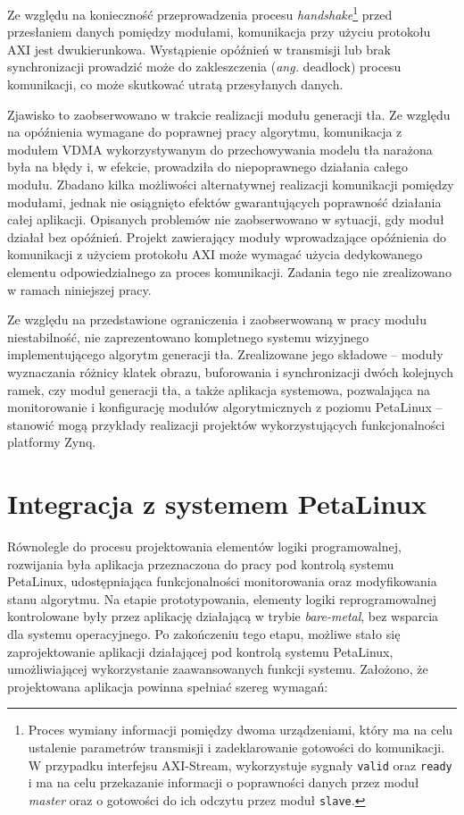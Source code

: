 Ze względu na konieczność przeprowadzenia procesu \textit{handshake}\footnote{Proces wymiany informacji pomiędzy dwoma urządzeniami, który ma na celu ustalenie parametrów transmisji i zadeklarowanie gotowości do komunikacji. W przypadku interfejsu AXI-Stream, wykorzystuje sygnały \texttt{valid} oraz \texttt{ready} i ma na celu przekazanie informacji o poprawności danych przez moduł \textit{master} oraz o gotowości do ich odczytu przez moduł \texttt{slave}.} przed przesłaniem danych pomiędzy modułami, komunikacja przy użyciu protokołu AXI jest dwukierunkowa. Wystąpienie opóźnień w transmisji lub brak synchronizacji prowadzić może do zakleszczenia (\emph{ang.} deadlock) procesu komunikacji, co może skutkować utratą przesyłanych danych.

Zjawisko to zaobserwowano w trakcie realizacji modułu generacji tła. Ze względu na opóźnienia wymagane do poprawnej pracy algorytmu, komunikacja z modułem VDMA wykorzystywanym do przechowywania modelu tła narażona była na błędy i, w efekcie, prowadziła do niepoprawnego działania całego modułu. Zbadano kilka możliwości alternatywnej realizacji komunikacji pomiędzy modułami, jednak nie osiągnięto efektów gwarantujących poprawność działania całej aplikacji. Opisanych problemów nie zaobserwowano w sytuacji, gdy moduł działał bez opóźnień.
Projekt zawierający moduły wprowadzające opóźnienia do komunikacji z użyciem protokołu AXI może wymagać użycia dedykowanego elementu odpowiedzialnego za proces komunikacji. Zadania tego nie zrealizowano w ramach niniejszej pracy.

Ze względu na przedstawione ograniczenia i zaobserwowaną w pracy modułu niestabilność, nie zaprezentowano kompletnego systemu wizyjnego implementującego algorytm generacji tła. Zrealizowane jego składowe -- moduły wyznaczania różnicy klatek obrazu, buforowania i synchronizacji dwóch kolejnych ramek, czy moduł generacji tła, a także aplikacja systemowa, pozwalająca na monitorowanie i konfigurację modułów algorytmicznych z poziomu PetaLinux -- stanowić mogą przykłady realizacji projektów wykorzystujących funkcjonalności platformy Zynq.

\section{Integracja z systemem PetaLinux}

Równolegle do procesu projektowania elementów logiki programowalnej, rozwijania była aplikacja przeznaczona do pracy pod kontrolą systemu PetaLinux, udostępniająca funkcjonalności monitorowania oraz modyfikowania stanu algorytmu.
Na etapie prototypowania, elementy logiki reprogramowalnej kontrolowane były przez aplikację działającą w trybie \textit{bare-metal}, bez wsparcia dla systemu operacyjnego.
Po zakończeniu tego etapu, możliwe stało się zaprojektowanie aplikacji działającej pod kontrolą systemu PetaLinux, umożliwiającej wykorzystanie zaawansowanych funkcji systemu.
Założono, że projektowana aplikacja powinna spełniać szereg wymagań:

